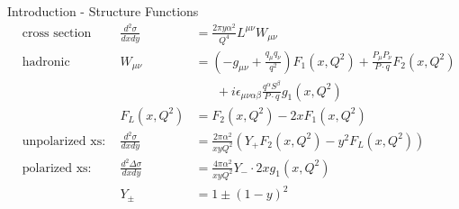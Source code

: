 \begin{frame}{Introduction - Structure Functions}
\begin{align}
&\text{cross section (xs):}&\frac{d^2\sigma}{dx dy} &= \frac{2\pi y \alpha^2}{Q^4} L^{\mu\nu} W_{\mu\nu}\\
&\text{hadronic tensor:}&W_{\mu\nu} &= \left(-g_{\mu\nu} + \frac{q_\mu q_\nu}{q^2}\right) F_1(x,Q^2) + \frac{P_\mu P_\nu}{P\cdot q} F_2(x,Q^2) \nonumber\\
&& & \hspace{20pt} + i \epsilon_{\mu\nu\alpha\beta} \frac{q^{\alpha}S^{\beta}}{P\cdot q} g_1(x,Q^2)\\
&&F_L(x,Q^2) &= F_2(x,Q^2) - 2xF_1(x,Q^2)\\
&\text{unpolarized xs:}&\frac{d^2\sigma}{dx dy} &= \frac{2\pi \alpha^2}{x y Q^2}\left(Y_+F_2(x,Q^2) - y^2F_L(x,Q^2)\right)\\
&\text{polarized xs:}&\frac{d^2\Delta\sigma}{dx dy} &= \frac{4\pi \alpha^2}{x y Q^2}Y_-\cdot 2xg_1(x,Q^2)\\
&&Y_\pm &= 1 \pm (1-y)^2
\end{align}
\end{frame}
\fi

